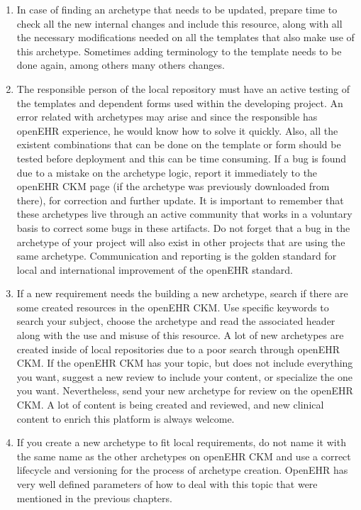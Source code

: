 \documentclass[mim_thesis.tex]{subfiles}
\begin{document}
\begin{enumerate}
\item In case of finding an archetype that needs to be updated, prepare time to check all the new internal changes and include this resource, along with all the necessary modifications needed on all the templates that also make use of this archetype. Sometimes adding terminology to the template needs to be done again, among others many others changes.
\item The responsible person of the local repository must have an active testing of the templates and dependent forms used within the developing project. An error related with archetypes may arise and since the responsible has openEHR experience, he would know how to solve it quickly. Also, all the existent combinations that can be done on the template or form should be tested before deployment and this can be time consuming. If a bug is found due to a mistake on the archetype logic, report it immediately to the openEHR CKM page (if the archetype was previously downloaded from there), for correction and further update. It is important to remember that these archetypes live through an active community that works in a voluntary basis to correct some bugs in these artifacts. Do not forget that a bug in the archetype of your project will also exist in other projects that are using the same archetype. Communication and reporting is the golden standard for local and international improvement of the openEHR standard.
\item If a new requirement needs the building a new archetype, search if there are some created resources in the openEHR CKM. Use specific keywords to search your subject, choose the archetype and read the associated header along with the use and misuse of this resource. A lot of new archetypes are created inside of local repositories due to a poor search through openEHR CKM. If the openEHR CKM has your topic, but does not include everything you want, suggest a new review to include your content, or specialize the one you want. Nevertheless, send your new archetype for review on the openEHR CKM. A lot of content is being created and reviewed, and new clinical content to enrich this platform is always welcome. 
\item If you create a new archetype to fit local requirements, do not name it with the same name as the other archetypes on openEHR CKM and use a correct lifecycle and versioning for the process of archetype creation. OpenEHR has very well defined parameters of how to deal with this topic that were mentioned in the previous chapters.

\end{enumerate}
\end{document}
